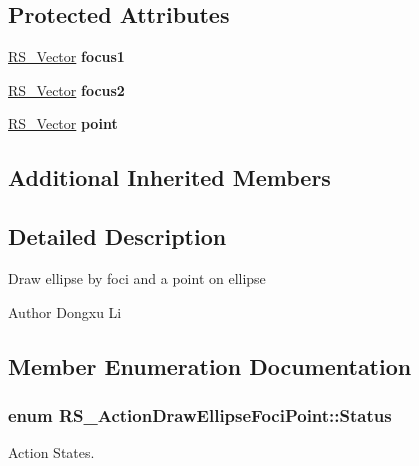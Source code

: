 \subsection*{Protected Attributes}
\begin{DoxyCompactItemize}
\item 
\hypertarget{classRS__ActionDrawEllipseFociPoint_adf4ffa658fcbd7b3880bf632dca408a0}{\hyperlink{classRS__Vector}{R\-S\-\_\-\-Vector} {\bfseries focus1}}\label{classRS__ActionDrawEllipseFociPoint_adf4ffa658fcbd7b3880bf632dca408a0}

\item 
\hypertarget{classRS__ActionDrawEllipseFociPoint_a93231da804ee2f82f54ce62ec4319574}{\hyperlink{classRS__Vector}{R\-S\-\_\-\-Vector} {\bfseries focus2}}\label{classRS__ActionDrawEllipseFociPoint_a93231da804ee2f82f54ce62ec4319574}

\item 
\hypertarget{classRS__ActionDrawEllipseFociPoint_a30a84149d76b3a2d18aa90655d6412d4}{\hyperlink{classRS__Vector}{R\-S\-\_\-\-Vector} {\bfseries point}}\label{classRS__ActionDrawEllipseFociPoint_a30a84149d76b3a2d18aa90655d6412d4}

\end{DoxyCompactItemize}
\subsection*{Additional Inherited Members}


\subsection{Detailed Description}
Draw ellipse by foci and a point on ellipse

\begin{DoxyAuthor}{Author}
Dongxu Li 
\end{DoxyAuthor}


\subsection{Member Enumeration Documentation}
\hypertarget{classRS__ActionDrawEllipseFociPoint_adea60cafc84f0fc17eb11045d00ba6f1}{
\subsubsection[{Status}]{\setlength{\rightskip}{0pt plus 5cm}enum {\bf R\-S\-\_\-\-Action\-Draw\-Ellipse\-Foci\-Point\-::\-Status}}}\label{classRS__ActionDrawEllipseFociPoint_adea60cafc84f0fc17eb11045d00ba6f1}
Action States. 

